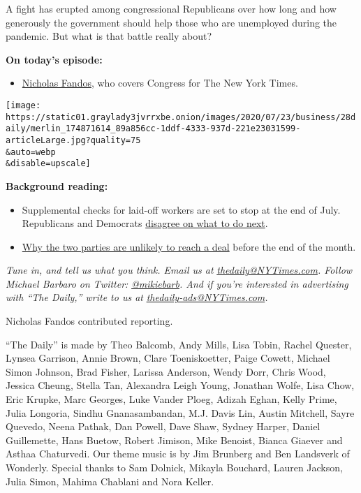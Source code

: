 A fight has erupted among congressional Republicans over how long and
how generously the government should help those who are unemployed
during the pandemic. But what is that battle really about?

\textbf{On today's episode:}

\begin{itemize}
\tightlist
\item
  \href{https://www.nytimes3xbfgragh.onion/by/nicholas-fandos}{Nicholas
  Fandos}, who covers Congress for The New York Times.
\end{itemize}

\texttt{[image: https://static01.graylady3jvrrxbe.onion/images/2020/07/23/business/28daily/merlin\_174871614\_89a856cc-1ddf-4333-937d-221e23031599-articleLarge.jpg?quality=75\\\&auto=webp\\\&disable=upscale]}

\textbf{Background reading:}

\begin{itemize}
\item
  Supplemental checks for laid-off workers are set to stop at the end of
  July. Republicans and Democrats
  \href{https://www.nytimes3xbfgragh.onion/2020/07/23/business/economy/unemployment-benefits.html}{disagree
  on what to do next}.
\item
  \href{https://www.nytimes3xbfgragh.onion/2020/07/26/us/politics/coronavirus-stimulus-bill-unemployment.html}{Why
  the two parties are unlikely to reach a deal} before the end of the
  month.
\end{itemize}

\emph{Tune in, and tell us what you think. Email us at}
\href{mailto:thedaily@NYTimes.com}{\emph{thedaily@NYTimes.com}}\emph{.
Follow Michael Barbaro on Twitter:}
\href{https://twitter.com/mikiebarb}{\emph{@mikiebarb}}\emph{. And if
you're interested in advertising with ``The Daily,'' write to us at}
\href{mailto:thedaily-ads@NYTimes.com}{\emph{thedaily-ads@NYTimes.com}}\emph{.}

Nicholas Fandos contributed reporting.

``The Daily'' is made by Theo Balcomb, Andy Mills, Lisa Tobin, Rachel
Quester, Lynsea Garrison, Annie Brown, Clare Toeniskoetter, Paige
Cowett, Michael Simon Johnson, Brad Fisher, Larissa Anderson, Wendy
Dorr, Chris Wood, Jessica Cheung, Stella Tan, Alexandra Leigh Young,
Jonathan Wolfe, Lisa Chow, Eric Krupke, Marc Georges, Luke Vander Ploeg,
Adizah Eghan, Kelly Prime, Julia Longoria, Sindhu Gnanasambandan, M.J.
Davis Lin, Austin Mitchell, Sayre Quevedo, Neena Pathak, Dan Powell,
Dave Shaw, Sydney Harper, Daniel Guillemette, Hans Buetow, Robert
Jimison, Mike Benoist, Bianca Giaever and Asthaa Chaturvedi. Our theme
music is by Jim Brunberg and Ben Landsverk of Wonderly. Special thanks
to Sam Dolnick, Mikayla Bouchard, Lauren Jackson, Julia Simon, Mahima
Chablani and Nora Keller.

